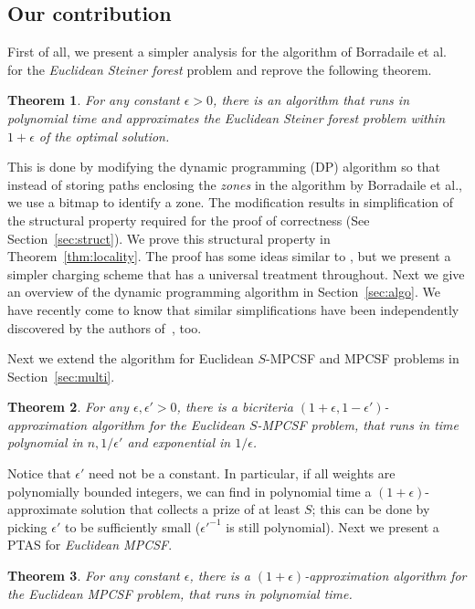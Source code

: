 \documentclass[extras,11pt]{article} \usepackage{fullpage}
\theoremstyle{mytheorem}
\newtheorem{theorem}{Theorem}
\newcommand{\eps}{\epsilon}
\newcommand{\prob}[1]{\textit{#1}}
\begin{document}
\subsection{Our contribution}\label{sec:contrib}
First of all, we present a simpler \iffalse\footnote{TODO: how many pages to how many pages?  which lemmas correspond to what?}\fi analysis for the algorithm of
Borradaile et al.~\cite{BKM08:euc-for} for the
\prob{Euclidean Steiner forest} problem and reprove the following
theorem.
\begin{theorem}\label{thm:sf}
 For any constant $\eps > 0$, there is an algorithm that runs in polynomial time
 and approximates the \prob{Euclidean Steiner forest} problem within $1+\eps$ of the
 optimal solution.
\end{theorem}
This is done by modifying the dynamic programming (DP) algorithm so
that instead of storing paths enclosing the \emph{zones} in the
algorithm by Borradaile et al., we use a bitmap to identify a zone.
The modification results in simplification of the structural
property required for the proof of correctness (See
Section~\ref{sec:struct}). We prove this structural property in
Theorem~\ref{thm:locality}. The proof has some ideas similar to
\cite{BKM08:euc-for}, but we present a simpler charging scheme that
has a universal treatment throughout. Next we give an overview of 
the dynamic programming algorithm in Section~\ref{sec:algo}. We have recently come to know that similar simplifications have been independently discovered by
the authors of~\cite{BKM08:euc-for}, too.

Next we extend the algorithm for Euclidean $S$-MPCSF and MPCSF
problems in Section~\ref{sec:multi}.
\begin{theorem}\label{thm:smpcsf}
 For any $\eps, \eps' > 0$, there is a bicriteria $(1+\eps, 1-\eps')$-approximation algorithm
 for the \prob{Euclidean $S$-MPCSF} problem,
  that runs in time polynomial
 in $n, 1/\eps'$ and exponential in $1/\eps$.
\end{theorem}
Notice that $\eps'$ need not be a constant.
In particular, if all weights are polynomially bounded integers,
we can find in polynomial time a $(1+\eps)$-approximate solution
that collects a prize of at least $S$; this can be done by picking
$\eps'$ to be sufficiently small ($\eps'^{-1}$ is still polynomial).
Next we present a PTAS for \prob{Euclidean MPCSF}.
\begin{theorem}\label{thm:mpcsf}
 For any constant $\eps$, there is a $(1+\eps)$-approximation algorithm
 for the \prob{Euclidean MPCSF} problem,
  that runs in  polynomial time.
\end{theorem}
\end{document}
